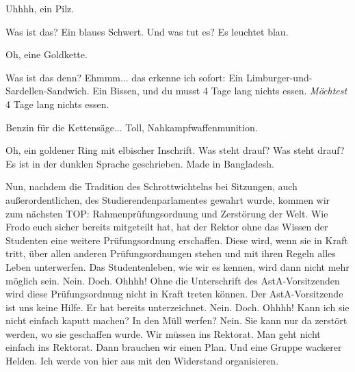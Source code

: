 \begin{verseplay}[10em]
\s{\Gandalf} Uhhhh, ein Pilz. 

\s{\Gimli} Was ist das?
\s{\Sum} Ein blaues Schwert.
\s{\Gimli} Und was tut es?
\s{\Sum} Es leuchtet blau. 

\s{\Frodo} Oh, eine Goldkette. 

\s{\Gimli}  Was ist das denn?
\s{\Frodo} Ehmmm... das erkenne ich sofort: Ein Limburger-und-Sardellen-Sandwich. Ein Bissen, und du musst 4 Tage lang nichts essen.
\s{\Elron}  \emph{Möchtest} 4 Tage lang nichts essen.

\s{\Legolars}  Benzin für die Kettensäge...  Toll, Nahkampfwaffenmunition. 

\s{\Elron} Oh, ein goldener Ring mit elbischer Inschrift.
\s{\Sum} Was steht drauf? Was steht drauf?
\s{\Elron} Es ist in der dunklen Sprache geschrieben.  Made in Bangladesh.

\s{\Elron} Nun, nachdem die Tradition des Schrottwichtelns bei Sitzungen, auch außerordentlichen, des Studierendenparlamentes gewahrt wurde, kommen wir zum nächsten TOP: Rahmenprüfungsordnung und Zerstörung der Welt.
\s{\Gandalf} Wie Frodo euch sicher bereits mitgeteilt hat, hat der Rektor ohne das Wissen der Studenten eine weitere Prüfungsordnung erschaffen.
\s{\Gandalf} Diese wird, wenn sie in Kraft tritt, über allen anderen Prüfungsordnungen stehen und mit ihren Regeln alles Leben unterwerfen. Das Studentenleben, wie wir es kennen, wird dann nicht mehr möglich sein.
\s{\Elron} Nein.
\s{\Gandalf} Doch.
\s{\Chor} Ohhhh!
\s{\Elron}  Ohne die Unterschrift des AstA-Vorsitzenden wird diese Prüfungsordnung nicht in Kraft treten können.
\s{\Gandalf} Der AstA-Vorsitzende ist uns keine Hilfe. Er hat bereits unterzeichnet.
\s{\Elron} Nein.
\s{\Gandalf} Doch.
\s{\Chor} Ohhhh!
\s{\Frodo} Kann ich sie nicht einfach kaputt machen? In den Müll werfen?
\s{\Gandalf} Nein. Sie kann nur da zerstört werden, wo sie geschaffen wurde. Wir müssen ins Rektorat.
\s{\Elron} Man geht nicht einfach ins Rektorat.
\s{\Gimli} Dann brauchen wir einen Plan. Und eine Gruppe wackerer Helden.
\s{\Elron} Ich werde von hier aus mit \Galadriel den Widerstand organisieren.


\end{verseplay}
